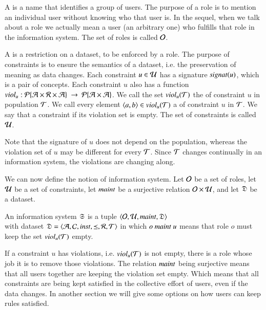 \documentclass{elsarticle}
\begin{document}
	A  is a name that identifies a group of users.
	The purpose of a role is to mention an individual user without knowing who that user is.
	In the sequel, when we talk about a role we actually mean a user (an arbitrary one) who fulfills that role in the information system.
	The set of roles is called $\mathcal{O}$.

	A  is a restriction on a dataset, to be enforced by a role.
	The purpose of constraints is to ensure the semantics of a dataset, i.e. the preservation of meaning as data changes.
	Each constraint $u\in\mathcal{U}$ has a signature $\text{\it signat\/}(u)$, which is a pair of concepts.
	Each constraint $u$ also has a function $\id{viol}_u:\powerset{\atoms\times\rels\times\atoms}\ \rightarrow\ \powerset{\atoms\times\atoms}$.
	We call the set $\text{\it viol\/}_{u}(\mathcal{T})$ the  of constraint $u$ in population $\mathcal{T}$.
	We call every element $\langle{a},{b}\rangle\in\text{\it viol\/}_{u}(\mathcal{T})$ a  of constraint $u$ in $\mathcal{T}$.
	We say that a constraint  if its violation set is empty.
	The set of constraints is called $\mathcal{U}$.

	Note that the signature of $u$ does not depend on the population, whereas the violation set of $u$ may be different for every $\mathcal{T}$.
	Since $\mathcal{T}$ changes continually in an information system, the violations are changing along. 

	We can now define the notion of information system.
	Let $\mathcal{O}$ be a set of roles,
	let $\mathcal{U}$ be a set of constraints, 
	let $\text{\it maint\/}$ be a surjective relation $\mathcal{O}\times\mathcal{U}$,
	and let $\mathfrak{D}$ be a dataset.
\begin{definition}
	\label{def:information system}
	\item An information system $\mathfrak{S}$ is a tuple $\langle\mathcal{O},\mathcal{U},\text{\it maint\/},\mathfrak{D}\rangle$\\
	with dataset $\mathfrak{D}=\langle\mathcal{A},\mathcal{C},\text{\it inst\/},\preceq,\mathcal{R},\mathcal{T}\rangle$
	in which $o\ \text{\it maint\/}\ u$ means that role $o$ must keep the set $\text{\it viol\/}_{u}(\mathcal{T})$ empty.
\end{definition}
	If a constraint $u$ has violations, i.e. $\text{\it viol\/}_{u}(\mathcal{T})$ is not empty, there is a role whose job it is to remove those violations.
	The relation $\text{\it maint\/}$ being surjective means that all users together are keeping the violation set empty.
	Which means that all constraints are being kept satisfied in the collective effort of users, even if the data changes.
	In another section we will give some options on how users can keep rules satisfied.
\end{document}
